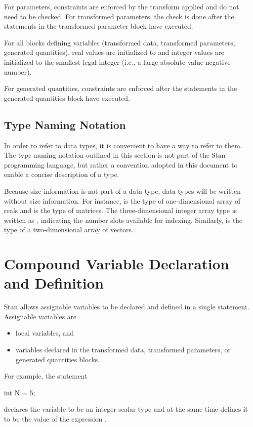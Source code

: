 For parameters, constraints are enforced by the transform applied and
do not need to be checked.  For transformed parameters, the check is
done after the statements in the transformed parameter block have
executed.

For all blocks defining variables (transformed data, transformed
parameters, generated quantities), real values are initialized to
 and integer values are initialized to the smallest legal
integer (i.e., a large absolute value negative number).

For generated quantities, constraints are enforced after the
statements in the generated quantities block have executed.


\subsection{Type Naming Notation}

In order to refer to data types, it is convenient to have a way to
refer to them.  The type naming notation outlined in this section is
not part of the Stan programming language, but rather a convention
adopted in this document to enable a concise description of a type.

Because size information is not part of a data type, data
types will be written without size information.  For instance,
 is the type of one-dimensional array of reals and
 is the type of matrices.  The three-dimensional integer
array type is written as , indicating the number slots
available for indexing.  Similarly,  is the type of a
two-dimensional array of vectors.


\section{Compound Variable Declaration and Definition}

Stan allows assignable variables to be declared and defined in a
single statement.  Assignable variables are
%
\begin{itemize}
\item local variables, and
\item variables declared in the transformed data,
transformed parameters, or generated quantities blocks.
\end{itemize}
%
For example, the statement
%
\begin{stancode}
int N = 5;
\end{stancode}
%
declares the variable  to be an integer scalar type and at the
same time defines it to be the value of the expression .

